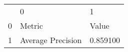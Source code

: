 \begin{tabular}{lll}
 & 0 & 1 \\
0 & Metric & Value \\
1 & Average Precision & 0.859100 \\
\end{tabular}
